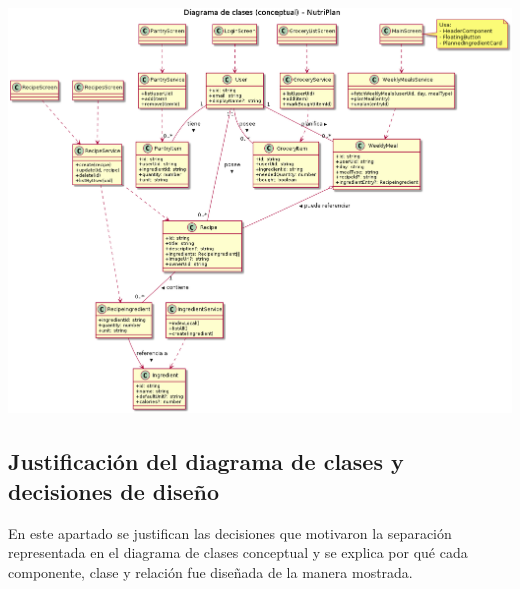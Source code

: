 \documentclass[twoside, openright, 11pt]{report}
\begin{document}
		
		\clearpage
		\thispagestyle{empty}
		\noindent
		\includegraphics[width=\paperwidth,height=\paperheight,keepaspectratio]{imagenes/class_diagram}
		\clearpage
		\restoregeometry
		
		
		
		\subsection{Justificación del diagrama de clases y decisiones de diseño}
		\label{sec:justificacion_diagrama}
		
		En este apartado se justifican las decisiones que motivaron la separación representada en el diagrama de clases conceptual y se explica por qué cada componente, clase y relación fue diseñada de la manera mostrada.
		
\end{document}
